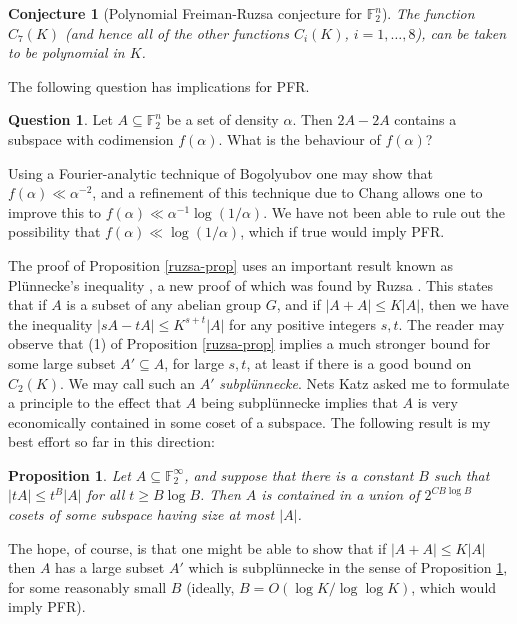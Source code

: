 \documentclass[12pt,a4paper,reqno]{amsart}
\numberwithin{equation}{section}
\theoremstyle{plain}
\newtheorem{proposition}[subsection]{Proposition}
\newtheorem{conjecture}[subsection]{Conjecture}
\theoremstyle{definition}
\newtheorem{question}[subsection]{Question}
\renewcommand{\leq}{\leqslant}
\renewcommand{\geq}{\geqslant}
\begin{document}
\begin{conjecture}[Polynomial Freiman-Ruzsa conjecture for $\mathbb{F}_2^n$]
The function $C_7(K)$ \textup{(}and hence all of the other functions $C_i(K)$, $i = 1,\dots,8$\textup{)}, can be taken to be polynomial in $K$.
\end{conjecture}

\noindent The following question has implications for PFR.

\begin{question}
Let $A \subseteq \mathbb{F}_2^n$ be a set of density $\alpha$. Then $2A - 2A$ contains a subspace with codimension $f(\alpha)$. What is the behaviour of $f(\alpha)$?\end{question}

\noindent Using a Fourier-analytic technique of Bogolyubov \cite{bogolyubov} one may show that $f(\alpha) \ll \alpha^{-2}$, and a refinement of this technique due to Chang \cite{chang} allows one to improve this to $f(\alpha) \ll \alpha^{-1}\log (1/\alpha)$. We have not been able to rule out the possibility that $f(\alpha) \ll \log(1/\alpha)$, which if true would imply PFR.\vspace{11pt}

\noindent The proof of Proposition \ref{ruzsa-prop} uses an important result known as Pl\"unnecke's inequality \cite{plunnecke}, a new proof of which was found by Ruzsa \cite{ruzsa-plun}. This states that if $A$ is a subset of any abelian group $G$, and if $|A + A| \leq K|A|$, then we have the inequality $|sA - tA| \leq K^{s+t}|A|$ for any positive integers $s,t$. The reader may observe that (1) of Proposition \ref{ruzsa-prop} implies a much stronger bound for some large subset $A' \subseteq A$, for large $s,t$, at least if there is a good bound on $C_2(K)$. We may call such an $A'$ \textit{subpl\"unnecke}. Nets Katz asked me to formulate a principle to the effect that $A$ being subpl\"unnecke implies that $A$ is very economically contained in some coset of a subspace. The following result is my best effort so far in this direction:

\begin{proposition}\label{subplunprop} Let $A \subseteq \mathbb{F}_2^{\infty}$, and suppose that there is a constant $B$ such that $|tA| \leq t^B|A|$ for all $t \geq B\log B$. Then $A$ is contained in a union of $2^{CB\log B}$ cosets of some subspace having size at most $|A|$.
\end{proposition}

\noindent The hope, of course, is that one might be able to show that if $|A + A| \leq K|A|$ then $A$ has a large subset $A'$ which is subpl\"unnecke in the sense of Proposition \ref{subplunprop}, for some reasonably small $B$ (ideally, $B = O(\log K/\log \log K)$, which would imply PFR).\vspace{11pt}
\end{document}
